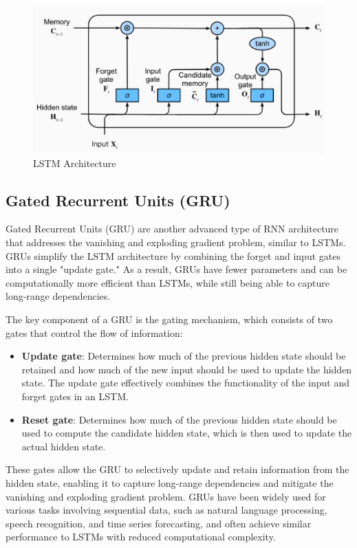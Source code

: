 \documentclass[12pt]{article}
\begin{document}
\begin{figure}[h]
    \centering
    \includegraphics[scale=0.3]{./media/lstm.png}
    \caption{LSTM Architecture}
    \label{fig:lstm}
\end{figure}

\subsection{Gated Recurrent Units (GRU)}

Gated Recurrent Units (GRU) are another advanced type of RNN architecture that addresses the vanishing and exploding gradient problem, similar to LSTMs. GRUs simplify the LSTM architecture by combining the forget and input gates into a single "update gate." As a result, GRUs have fewer parameters and can be computationally more efficient than LSTMs, while still being able to capture long-range dependencies.

The key component of a GRU is the gating mechanism, which consists of two gates that control the flow of information:

\begin{itemize}
\item \textbf{Update gate}: Determines how much of the previous hidden state should be retained and how much of the new input should be used to update the hidden state. The update gate effectively combines the functionality of the input and forget gates in an LSTM.
\item \textbf{Reset gate}: Determines how much of the previous hidden state should be used to compute the candidate hidden state, which is then used to update the actual hidden state.
\end{itemize}
These gates allow the GRU to selectively update and retain information from the hidden state, enabling it to capture long-range dependencies and mitigate the vanishing and exploding gradient problem. GRUs have been widely used for various tasks involving sequential data, such as natural language processing, speech recognition, and time series forecasting, and often achieve similar performance to LSTMs with reduced computational complexity.
\end{document}
